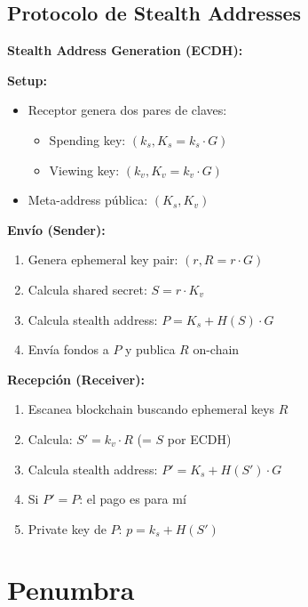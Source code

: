 \documentclass[11pt,a4paper,twoside]{book}
\begin{document}
\subsection{Protocolo de Stealth Addresses}

\begin{mathnote}
\textbf{Stealth Address Generation (ECDH):}

\textbf{Setup:}
\begin{itemize}
    \item Receptor genera dos pares de claves:
    \begin{itemize}
        \item Spending key: $(k_s, K_s = k_s \cdot G)$
        \item Viewing key: $(k_v, K_v = k_v \cdot G)$
    \end{itemize}
    \item Meta-address p\'ublica: $(K_s, K_v)$
\end{itemize}

\textbf{Env\'io (Sender):}
\begin{enumerate}
    \item Genera ephemeral key pair: $(r, R = r \cdot G)$
    \item Calcula shared secret: $S = r \cdot K_v$
    \item Calcula stealth address: $P = K_s + H(S) \cdot G$
    \item Env\'ia fondos a $P$ y publica $R$ on-chain
\end{enumerate}

\textbf{Recepci\'on (Receiver):}
\begin{enumerate}
    \item Escanea blockchain buscando ephemeral keys $R$
    \item Calcula: $S' = k_v \cdot R$ (= $S$ por ECDH)
    \item Calcula stealth address: $P' = K_s + H(S') \cdot G$
    \item Si $P' = P$: el pago es para m\'i
    \item Private key de $P$: $p = k_s + H(S')$
\end{enumerate}
\end{mathnote}

\section{Penumbra}
\label{sec:penumbra}
\end{document}
